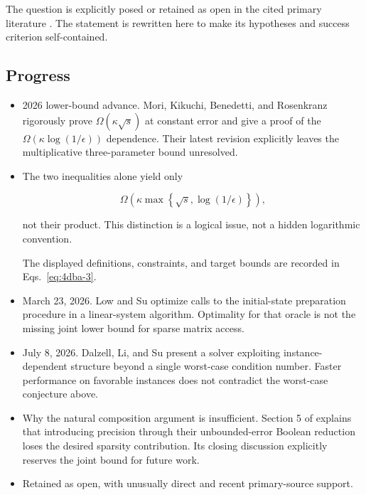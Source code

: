 The question is explicitly posed or retained as open in the cited primary literature .  The statement is rewritten here to make its hypotheses and success criterion self-contained.

\subsection*{Progress}

\begin{itemize}
  \item 2026 lower-bound advance. Mori, Kikuchi, Benedetti, and Rosenkranz rigorously prove $\Omega(\kappa\sqrt{s})$ at constant error and give a proof of the $\Omega(\kappa\log(1/\epsilon))$ dependence. Their latest revision explicitly leaves the multiplicative three-parameter bound unresolved. 

  \item The two inequalities alone yield only

\begin{equation}
\Omega\!\left(\kappa\max\left\{\sqrt{s},\log(1/\epsilon)\right\}\right),
\label{eq:4dba-3}
\end{equation}

not their product. This distinction is a logical issue, not a hidden logarithmic convention.

The displayed definitions, constraints, and target bounds are recorded in Eqs.~\eqref{eq:4dba-3}.

  \item March 23, 2026. Low and Su optimize calls to the initial-state preparation procedure in a linear-system algorithm. Optimality for that oracle is not the missing joint lower bound for sparse matrix access. 

  \item July 8, 2026. Dalzell, Li, and Su present a solver exploiting instance-dependent structure beyond a single worst-case condition number. Faster performance on favorable instances does not contradict the worst-case conjecture above. 

  \item Why the natural composition argument is insufficient. Section 5 of  explains that introducing precision through their unbounded-error Boolean reduction loses the desired sparsity contribution. Its closing discussion explicitly reserves the joint bound for future work.

  \item Retained as open, with unusually direct and recent primary-source support.
\end{itemize}

